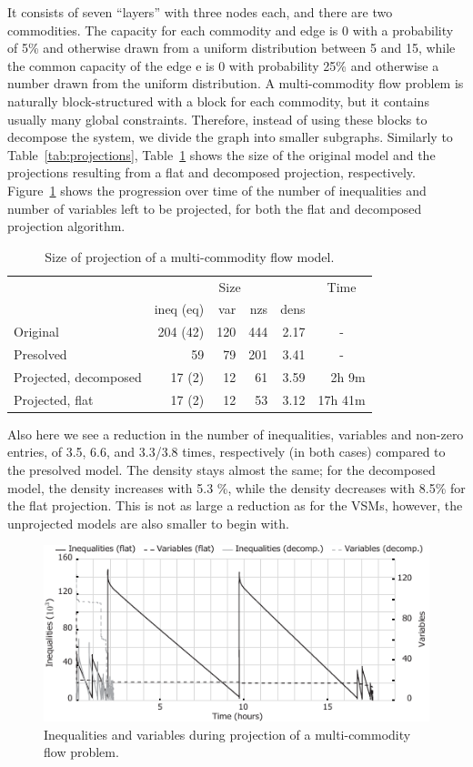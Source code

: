 \documentclass{llncs}
\newcommand{\btablesize}{\begin{scriptsize}}
\newcommand{\etablesize}{\end{scriptsize}}
\begin{document}
It consists of seven ``layers'' with three nodes each, and there are two commodities. The capacity for each commodity and edge is 0 with a probability of 5\% and otherwise drawn from a uniform distribution between 5 and 15, while the common capacity of the edge e is 0 with probability 25\% and otherwise a number drawn from the uniform distribution. A multi-commodity flow problem is naturally block-structured with a block for each commodity, but it contains usually many global constraints. Therefore, instead of using these blocks to decompose the system, we divide the graph into smaller subgraphs. Similarly to Table~\ref{tab:projections}, Table~\ref{tab:multicom} shows the size of the original model and the projections resulting from a flat and decomposed projection, respectively. Figure~\ref{fig:multicom} shows the progression over time of the number of inequalities and number of variables left to be projected, for both the flat and decomposed projection algorithm.
\begin{table}[t!]
\caption{Size of projection of a multi-commodity flow model.}
\label{tab:multicom}
\centering
\btablesize
\begin{tabular}{l|r@{ / }r@{ / }r@{ / }r|r}
&\multicolumn{4}{c|}{Size}&\multicolumn{1}{c}{Time}\\
											&ineq (eq)&var &nzs &dens&\\
\hline
Original							&204 (42) & 120& 444&2.17&\multicolumn{1}{c}{-}\\
Presolved							& 59		  &  79& 201&3.41&\multicolumn{1}{c}{-}\\
Projected, decomposed	& 17 (2)  &  12&  61&3.59& 2h \phantom{9}9m \\
Projected, flat				& 17 (2)  &  12&  53&3.12& 17h 41m\\
\end{tabular}
\etablesize
\end{table}
Also here we see a reduction in the number of inequalities, variables and non-zero entries, of 3.5, 6.6, and 3.3/3.8 times, respectively (in both cases) compared to the presolved model. The density stays almost the same; for the decomposed model, the density increases with 5.3 \%, while the density decreases with 8.5\% for the flat projection. This is not as large a reduction as for the VSMs, however, the unprojected models are also smaller to begin with. 
\begin{figure}[b!]
	\centering
		\includegraphics{figures/newMultiComGraph.pdf}
	\caption{Inequalities and variables during projection of a multi-commodity flow problem.}
	\label{fig:multicom}
\end{figure}
\end{document}
